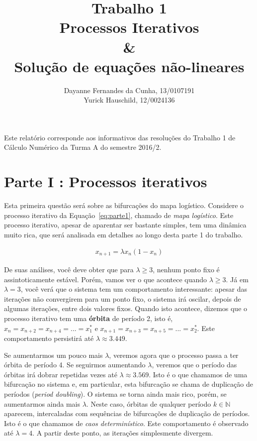 \documentclass[12pt]{article}
\title{Trabalho 1\\
Processos Iterativos\\
\& \\
Solução de equações não-lineares}
\author{Dayanne Fernandes da Cunha, 13/0107191\\
       Yurick Hauschild, 12/0024136
}
\begin{document}
\maketitle


 \begin{resumo}
 	Este relatório corresponde aos informativos das resoluções do Trabalho 1 de Cálculo Numérico da Turma A do semestre 2016/2.
 \end{resumo}

\section*{Parte I : Processos iterativos}
\label{sec:parte1}

Esta primeira questão será sobre as bifurcações do mapa logístico. Considere o processo iterativo da Equação~\ref{eq:parte1}, chamado de \textit{mapa logístico}. Este processo iterativo, apesar de aparentar ser bastante simples, tem uma dinâmica muito rica, que será analisada em detalhes ao longo desta parte 1 do trabalho.

\begin{eqnarray}
x_{n+1} = \lambda x_{n}(1 - x_{n})
\label{eq:parte1}
\end{eqnarray}

De suas análises, você deve obter que para $\lambda \geq 3$, nenhum ponto fixo é assintoticamente estável. Porém, vamos ver o que acontece quando $\lambda \geq 3$. Já em $\lambda = 3$, você verá que o sistema tem um comportamento interessante: apesar das iterações não convergirem para um ponto fixo, o sistema irá oscilar, depois de algumas iterações, entre dois valores fixos. Quando isto acontece, dizemos que o processo iterativo tem uma \textbf{órbita} de período 2, isto é, $x_{n} = x_{n+2} = x_{n+4} = ... = x_{1}^{*}$ e $x_{n+1} = x_{n+3} = x_{n+5} = ... = x_{2}^{*}$. Este comportamento persistirá até $\lambda \approx 3.449$.

Se aumentarmos um pouco mais $\lambda$, veremos agora que o processo passa a ter órbita de período 4. Se seguirmos aumentando $\lambda$, veremos que o período das órbitas irá dobrar repetidas vezes até $\lambda \approx 3.569$. Isto é o que chamamos de uma bifurcação no sistema e, em particular, esta bifurcação se chama de duplicação de períodos (\textit{period doubling}). O sistema se torna ainda mais rico, porém, se aumentarmos ainda mais $\lambda$. Neste caso, órbitas de qualquer período $k \in  \mathbb{N}$ aparecem, intercaladas com sequências de bifurcações de duplicação de períodos. Isto é o que chamamos de \textit{caos determinístico}. Este comportamento é observado até $\lambda = 4$. A partir deste ponto, as iterações simplesmente divergem.
\end{document}
